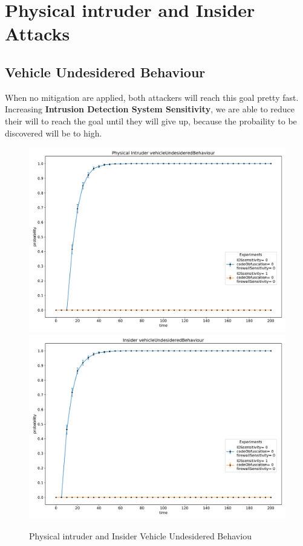 \section{Physical intruder and Insider Attacks}

\subsection*{Vehicle Undesidered Behaviour}
When no mitigation are applied, both attackers will reach this goal pretty fast. Increasing 
\textbf{Intrusion Detection System Sensitivity}, we are able to reduce their will to reach the goal
until they will give up, because the probaility to be discovered will be to high.
\begin{figure}[H]
    \begin{center}
        \includegraphics[scale=0.4]{img/Physical_vOB.pdf}
        \includegraphics[scale=0.4]{img/Insider_vOB.pdf}
    \end{center}
    \caption{Physical intruder and Insider Vehicle Undesidered Behaviou}
    \label{fig:P_I_vob}
    \vspace*{-3cm}
\end{figure}

